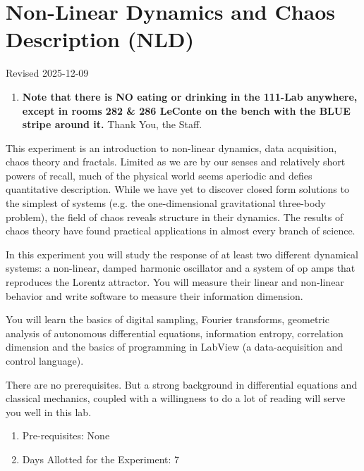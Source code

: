 \documentclass{../lab}
\begin{document}
\maketitle

\tableofcontents

\section{Non-Linear Dynamics and Chaos Description (NLD)}

Revised 2025-12-09

\begin{enumerate}
    \item \textbf{Note that there is NO eating or drinking in the 111-Lab anywhere, except in rooms 282 \& 286 LeConte on the bench with the BLUE stripe around it.} Thank You, the Staff.
\end{enumerate}

\newpage

This experiment is an introduction to non-linear dynamics, data acquisition, chaos theory and fractals. Limited as we are by our senses and relatively short powers of recall, much of the physical world seems aperiodic and defies quantitative description. While we have yet to discover closed form solutions to the simplest of systems (e.g. the one-dimensional gravitational three-body problem), the field of chaos reveals structure in their dynamics. The results of chaos theory have found practical applications in almost every branch of science.

In this experiment you will study the response of at least two different dynamical systems: a non-linear, damped harmonic oscillator and a system of op amps that reproduces the Lorentz attractor. You will measure their linear and non-linear behavior and write software to measure their information dimension.

You will learn the basics of digital sampling, Fourier transforms, geometric analysis of autonomous differential equations, information entropy, correlation dimension and the basics of programming in LabView (a data-acquisition and control language).

There are no prerequisites. But a strong background in differential equations and classical mechanics, coupled with a willingness to do a lot of reading will serve you well in this lab.

\begin{enumerate}
    \item Pre-requisites: None

    \item Days Allotted for the Experiment: 7

\end{enumerate}
\end{document}
